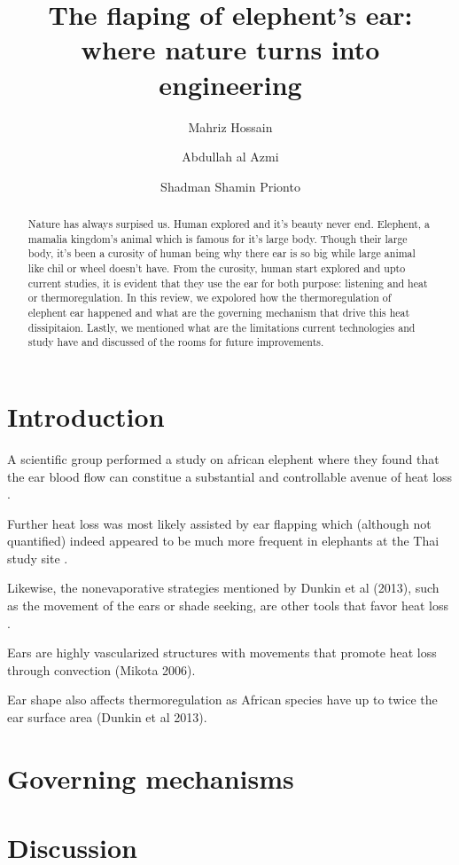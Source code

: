 \documentclass{article}
\title{The flaping of elephent's ear: where nature turns into engineering}
\author[1]{Mahriz Hossain}
\author[2]{Abdullah al Azmi}
\author[3]{Shadman Shamin Prionto}
\affil[1-3]{Department of Mechanical and Production Engineering, Islamic University of Technology (IUT), Bangladesh}
\begin{document}
\maketitle

\begin{abstract}

	Nature has always surpised us. Human explored and it's beauty never end. Elephent, a mamalia kingdom's animal which is famous for it's large body. Though their large body, it's been a curosity of human being why there ear is so big while large animal like chil or wheel doesn't have. From the curosity, human start explored and upto current studies, it is evident that they use the ear for both purpose: listening and heat or thermoregulation. In this review, we expolored how the thermoregulation of elephent ear happened and what are the governing mechanism that drive this heat dissipitaion. Lastly, we mentioned what are the limitations current technologies and study have and discussed of the rooms for future improvements.

\end{abstract}

\section{Introduction}

A scientific group performed a study on african elephent where they found that the ear blood flow can constitue a substantial and controllable avenue of heat loss \autocite{dominguez-olivaAnatomicalPhysiologicalBehavioral2022}.

Further heat loss was most likely assisted by ear flapping which (although not quantified) indeed appeared to be much more frequent in elephants at the Thai study site \autocite{weissenbockTakingHeatThermoregulation2012}.

Likewise, the nonevaporative strategies mentioned by Dunkin et al (2013), such as the movement of the ears or shade seeking, are other tools that favor heat loss \autocite{dominguez-olivaAnatomicalPhysiologicalBehavioral2022}.

Ears are highly vascularized structures with movements that promote heat loss through convection (Mikota 2006).

Ear shape also affects thermoregulation as African species have up to twice the ear surface area (Dunkin et al 2013).

\section{Governing mechanisms}



\section{Discussion}
\end{document}
